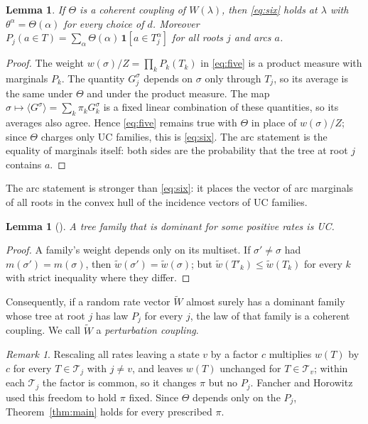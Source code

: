 \documentclass[11pt]{amsart}
\newtheorem{lemma}[theorem]{Lemma}
\theoremstyle{definition}
\theoremstyle{remark}
\newtheorem{remark}[theorem]{Remark}
\newcommand{\T}{\mathcal T}
\begin{document}
\begin{lemma}\label{lem:coupling}
If $\Theta$ is a coherent coupling of $W(\lambda)$, then \eqref{eq:six} holds at $\lambda$ with $\theta^\alpha=\Theta(\alpha)$ for every choice of $d$. Moreover $P_j(a\in T)=\sum_\alpha\Theta(\alpha)\,\mathbf 1[a\in T^\alpha_j]$ for all roots $j$ and arcs $a$.
\end{lemma}

\begin{proof}
The weight $w(\sigma)/Z=\prod_kP_k(T_k)$ in \eqref{eq:five} is a product measure with marginals $P_k$. The quantity $G^\sigma_j$ depends on $\sigma$ only through $T_j$, so its average is the same under $\Theta$ and under the product measure. The map $\sigma\mapsto\langle G^\sigma\rangle=\sum_k\pi_kG_k^\sigma$ is a fixed linear combination of these quantities, so its averages also agree. Hence \eqref{eq:five} remains true with $\Theta$ in place of $w(\sigma)/Z$; since $\Theta$ charges only UC families, this is \eqref{eq:six}. The arc statement is the equality of marginals itself: both sides are the probability that the tree at root $j$ contains $a$.
\end{proof}

The arc statement is stronger than \eqref{eq:six}: it places the vector of arc marginals of all roots in the convex hull of the incidence vectors of UC families.

\begin{lemma}[{\cite[Lemma 4]{FH2026}}]\label{lem:dominant}
A tree family that is dominant for some positive rates is UC.
\end{lemma}

\begin{proof}
A family's weight depends only on its multiset. If $\sigma'\neq\sigma$ had $m(\sigma')=m(\sigma)$, then $\widetilde w(\sigma')=\widetilde w(\sigma)$; but $\widetilde w(T'_k)\le\widetilde w(T_k)$ for every $k$ with strict inequality where they differ.
\end{proof}

Consequently, if a random rate vector $\widetilde W$ almost surely has a dominant family whose tree at root $j$ has law $P_j$ for every $j$, the law of that family is a coherent coupling. We call $\widetilde W$ a \emph{perturbation coupling}.

\begin{remark}\label{rem:pifree}
Rescaling all rates leaving a state $v$ by a factor $c$ multiplies $w(T)$ by $c$ for every $T\in\T_j$ with $j\neq v$, and leaves $w(T)$ unchanged for $T\in\T_v$; within each $\T_j$ the factor is common, so it changes $\pi$ but no $P_j$. Fancher and Horowitz used this freedom to hold $\pi$ fixed. Since $\Theta$ depends only on the $P_j$, Theorem~\ref{thm:main} holds for every prescribed $\pi$.
\end{remark}
\end{document}
